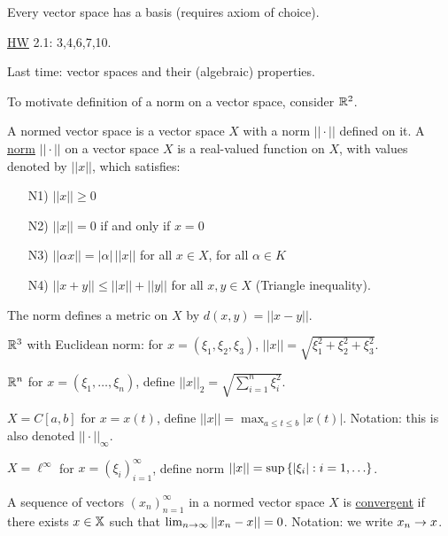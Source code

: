 \documentclass[]{article}
\begin{document}
\begin{theorem}
	Every vector space has a basis (requires axiom of choice).
\end{theorem}

\ul{HW} 2.1: 3,4,6,7,10.

Last time: vector spaces and their (algebraic) properties.

To motivate definition of a norm on a vector space, consider $\mathbb{R}^2$.

\begin{definition}
	A normed vector space is a vector space $X$ with a norm $||\cdot||$ defined on it.
	A \ul{norm} $||\cdot||$ on a vector space $X$ is a real-valued function on $X$, with values denoted by $||x||$, which satisfies:
	\begin{itemize}
		\item[N1)] $||x||\geq 0$
		\item[N2)] $||x||=0$ if and only if $x=0$
		\item[N3)] $||\alpha x|| = |\alpha|\,||x||$ for all $x\in X$, for all $\alpha\in K$
		\item[N4)] $||x+y||\leq ||x||+||y||$ for all $x,y\in X$ (Triangle inequality).
	\end{itemize}
\end{definition}
\begin{note}
	The norm defines a metric on $X$ by $d(x,y) = ||x-y||$.
\end{note}
\begin{example}
	$\mathbb{R}^3$ with Euclidean norm: for $x=(\xi_1,\xi_2,\xi_3)$, $||x||=\sqrt{\xi_1^2+\xi_2^2+\xi_3^2}$.
\end{example}
\begin{example}
	$\mathbb{R}^n$ for $x=(\xi_1,\dots,\xi_n)$, define $||x||_2 = \sqrt{\sum_{i=1}^n \xi_i^2}$.
\end{example}
\begin{example}
	$X = C[a,b]$ for $x=x(t)$, define $\displaystyle||x|| = \max_{a\leq t\leq b}|x(t)|$.
	Notation: this is also denoted $||\cdot||_\infty$.
\end{example}
\begin{example}
	$X = \ell^\infty$ for $x = (\xi_i)_{i=1}^\infty$, define norm $||x|| = \sup\setc{|\xi_i|}{i=1,\dots}$.
\end{example}

\begin{definition}
	A sequence of vectors $(x_n)_{n=1}^\infty$ in a normed vector space $X$ is \ul{convergent} if there exists $x\in\mathbb{X}$ such that $\lim_{n\rightarrow\infty}||x_n-x||=0$.
	Notation: we write $x_n\rightarrow x$.
\end{definition}
\end{document}
